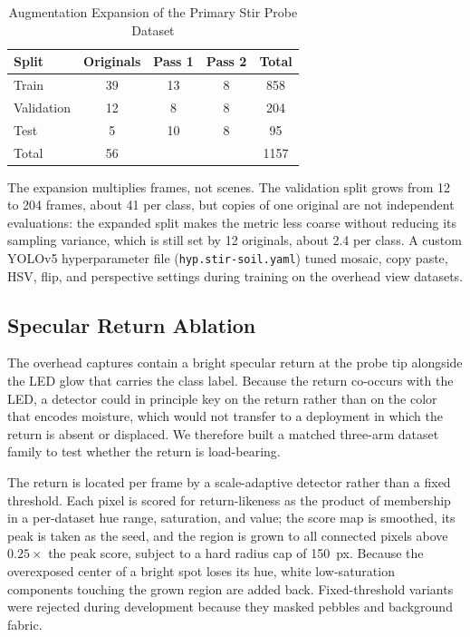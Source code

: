 ﻿\documentclass[journal]{IEEEtran}
\begin{document}
\begin{table}[!t]
\renewcommand{\arraystretch}{1.3}
\caption{Augmentation Expansion of the Primary Stir Probe Dataset}
\label{tab:aug}
\centering
\begin{tabular}{l c c c c}
\toprule
\textbf{Split} & \textbf{Originals} & \textbf{Pass 1} & \textbf{Pass 2} & \textbf{Total} \\
\midrule
Train      & 39 & 13 & 8 & 858 \\
Validation & 12 & 8  & 8 & 204 \\
Test       & 5  & 10 & 8 & 95 \\
\midrule
Total      & 56 &    &   & 1157 \\
\bottomrule
\end{tabular}
\end{table}

The expansion multiplies frames, not scenes. The validation split grows from 12 to 204 frames, about 41 per class, but copies of one original are not independent evaluations: the expanded split makes the metric less coarse without reducing its sampling variance, which is still set by 12 originals, about 2.4 per class. A custom YOLOv5 hyperparameter file (\texttt{hyp.stir-soil.yaml}) tuned mosaic, copy paste, HSV, flip, and perspective settings during training on the overhead view datasets.

\subsection{Specular Return Ablation}
\label{sec:ablation-method}
The overhead captures contain a bright specular return at the probe tip alongside the LED glow that carries the class label. Because the return co-occurs with the LED, a detector could in principle key on the return rather than on the color that encodes moisture, which would not transfer to a deployment in which the return is absent or displaced. We therefore built a matched three-arm dataset family to test whether the return is load-bearing.

The return is located per frame by a scale-adaptive detector rather than a fixed threshold. Each pixel is scored for return-likeness as the product of membership in a per-dataset hue range, saturation, and value; the score map is smoothed, its peak is taken as the seed, and the region is grown to all connected pixels above $0.25\times$ the peak score, subject to a hard radius cap of 150~px. Because the overexposed center of a bright spot loses its hue, white low-saturation components touching the grown region are added back. Fixed-threshold variants were rejected during development because they masked pebbles and background fabric.
\end{document}

